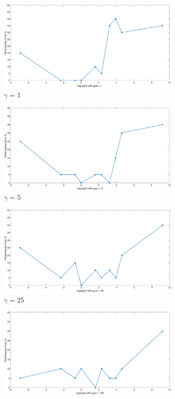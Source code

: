 \documentclass[12pt]{report}
\begin{document}
{\begin{figure}[!ht]
\begin{floatrow}
{\begin{subfigure}{.3\textwidth}
		\end{subfigure}%
		\begin{subfigure}{.3\textwidth}
			\includegraphics[height=0.35\linewidth,width=0.7\linewidth]{Ex1.3_gam(1).eps}
			\caption{$\gamma$ = 1}
			\label{fig:rand_gamma(1))}
		\end{subfigure}
		\begin{subfigure}{.3\textwidth}
			\includegraphics[height=0.35\linewidth,width=0.7\linewidth]{Ex1.3_gam(5).eps}
			\caption{$\gamma$ = 5}
			\label{fig:rand_gamma(5)}
		\end{subfigure}%
		\begin{subfigure}{.3\textwidth}
			\includegraphics[height=0.35\linewidth,width=0.7\linewidth]{Ex1.3_gam(25).eps}
			\caption{$\gamma$ = 25}
			\label{fig:rand_gamma(25)}
		\end{subfigure}
		\begin{subfigure}{.3\textwidth}
			\includegraphics[height=0.35\linewidth,width=0.7\linewidth]{Ex1.3_gam(100).eps}

\end{subfigure}}
\end{floatrow}
\end{figure}}
\end{document}
